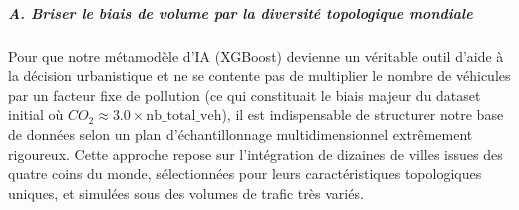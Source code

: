 \documentclass[10pt, a4paper]{article}
\begin{document}
\subparagraph{A. Briser le biais de volume par la diversité topologique
mondiale}\label{a.-briser-le-biais-de-volume-par-la-diversituxe9-topologique-mondiale}

Pour que notre métamodèle d'IA (XGBoost) devienne un véritable outil
d'aide à la décision urbanistique et ne se contente pas de multiplier le
nombre de véhicules par un facteur fixe de pollution (ce qui constituait
le biais majeur du dataset initial où
\(CO_2 \approx 3.0 \times \text{nb\_total\_veh}\)), il est indispensable
de structurer notre base de données selon un plan d'échantillonnage
multidimensionnel extrêmement rigoureux. Cette approche repose sur
l'intégration de dizaines de villes issues des quatre coins du monde,
sélectionnées pour leurs caractéristiques topologiques uniques, et
simulées sous des volumes de trafic très variés.
\end{document}
